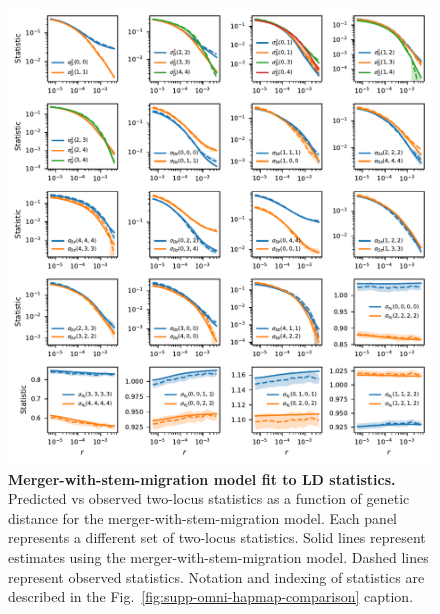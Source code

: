 \documentclass[]{article}
\begin{document}
\begin{figure}[ht]
    \centering
    \includegraphics{figures/supp-merger-with-stem-migration-fits.pdf}
    \caption{
        \textbf{Merger-with-stem-migration model fit to LD statistics.}
        Predicted vs observed two-locus statistics as a function of genetic
        distance for the merger-with-stem-migration model. Each panel
        represents a different set of two-locus statistics.
        Solid lines represent estimates using the
        merger-with-stem-migration model.
        Dashed lines represent observed statistics.
        Notation and indexing of statistics are described in the
        Fig.~\ref{fig:supp-omni-hapmap-comparison} caption.
    }
    \label{fig:supp-merger-with-stem-migration-fits}
\end{figure}
\end{document}
